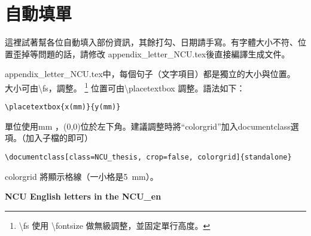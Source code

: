 \documentclass[class=NCU_thesis, crop=false]{standalone}
\begin{document}
\chapter{自動填單}
這裡試著幫各位自動填入部份資訊，其餘打勾、日期請手寫。有字體大小不符、位置歪掉等問題的話，請修改 appendix\_letter\_NCU.tex後直接編譯生成文件。

appendix\_letter\_NCU.tex中，每個句子（文字項目）都是獨立的大小與位置。 大小可由\textbackslash{}fs，調整。
\footnote{\textbackslash{}fs 使用 \textbackslash{}fontsize 做無級調整，並固定單行高度。 }
位置可由\textbackslash{}placetextbox 調整。語法如下：
\begin{lstlisting}[style=LatexStyle,caption={}]
\placetextbox{x(mm)}{y(mm)}
\end{lstlisting}
單位使用mm ，(0,0)位於左下角。建議調整時將``colorgrid''加入documentclass選項。（加入子檔的即可）
\begin{lstlisting}[style=LatexStyle,caption={}]
\documentclass[class=NCU_thesis, crop=false, colorgrid]{standalone}
\end{lstlisting}
colorgrid 將顯示格線（一小格是\SI{5}{\milli\metre}）。

\begin{center}
{ \noindent\color{red}\bfseries\Large NCU English letters in the NCU\_en}
\end{center}

\cleardoublepage
\pagestyle{empty}
\sffamily





\pagestyle{fancy}
\end{document}
